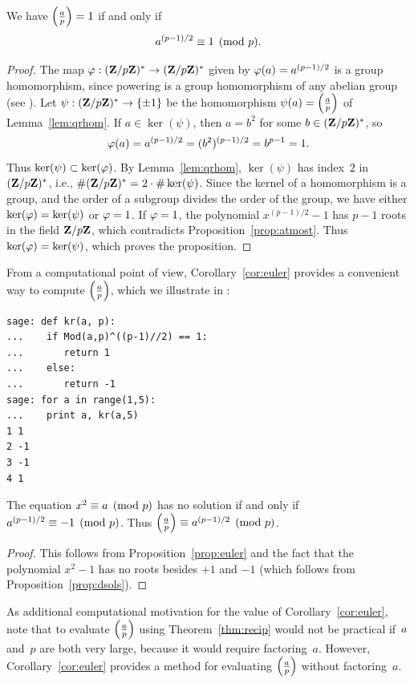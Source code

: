 \begin{proposition}\label{prop:euler}
We have $\left(\frac{a}{p}\right)=1$ if and only if
$$
a^{(p-1)/2}\equiv 1\pmod{p}.
$$
\end{proposition}
\begin{proof}
  The map $\varphi:(\mathbf{Z}/p\mathbf{Z}{})^*\to (\mathbf{Z}/p\mathbf{Z}{})^*$ given by $\varphi(a)=
  a^{(p-1)/2}$ is a group homomorphism, since powering is a group
  homomorphism of any abelian group (see ).
  Let $\psi:(\mathbf{Z}/p\mathbf{Z}{})^*\to \{\pm 1\}$
 be the homomorphism $\psi(a) = \left(\frac{a}{p}\right)$ of
  Lemma~\ref{lem:qrhom}.  If $a\in \ker(\psi)$, then $a=b^2$ for some
  $b\in(\mathbf{Z}/p\mathbf{Z}{})^*$, so
  $$
  \varphi(a)=a^{(p-1)/2} = (b^2)^{(p-1)/2} = b^{p-1} = 1.
  $$
  Thus $\ker(\psi)\subset \ker(\varphi)$.  By Lemma~\ref{lem:qrhom},
  $\ker(\psi)$ has index~$2$ in $(\mathbf{Z}/p\mathbf{Z}{})^*$,
i.e., $\#(\mathbf{Z}/p\mathbf{Z}{})^*=2\cdot \#\ker(\psi)$.
Since the kernel of a homomorphism is a group, and the
order of a subgroup divides the order of the group,
we have either $\ker(\varphi)=\ker(\psi)$ or $\varphi=1$.  If $\varphi=1$,
  the polynomial $x^{(p-1)/2}-1$ has $p-1$ roots in the field $\mathbf{Z}/p\mathbf{Z}{}$,
  which contradicts Proposition~\ref{prop:atmost}. Thus
  $\ker(\varphi)=\ker(\psi)$, which proves the proposition.
\end{proof}

\begin{sg}
From a computational point of view, Corollary~\ref{cor:euler}
provides a convenient way to compute $\left(\frac{a}{p}\right)$, which we
illustrate in \sage:
\begin{verbatim}
sage: def kr(a, p):
...    if Mod(a,p)^((p-1)//2) == 1:
...       return 1
...    else:
...       return -1
sage: for a in range(1,5):
...    print a, kr(a,5)
1 1
2 -1
3 -1
4 1
\end{verbatim}
\end{sg}


\begin{corollary}\label{cor:euler}
The equation $x^2\equiv a\pmod{p}$ has no solution if and
only if $a^{(p-1)/2}\equiv -1\pmod{p}$.
Thus $\left(\frac{a}{p}\right) \equiv a^{(p-1)/2}\pmod{p}$.
\end{corollary}
\begin{proof}
This follows from Proposition~\ref{prop:euler} and the
 fact that the polynomial $x^2-1$ has no roots
besides $+1$ and $-1$ (which follows from
Proposition~\ref{prop:dsols}).
\end{proof}

As additional computational motivation for the value of
Corollary~\ref{cor:euler}, note that to evaluate $\left(\frac{a}{p}\right)$ using
Theorem~\ref{thm:recip} would not be practical if~$a$ and~$p$ are
both very large, because it would require factoring~$a$.  However,
Corollary~\ref{cor:euler} provides a method for evaluating $\left(\frac{a}{p}\right)$
without factoring~$a$.


